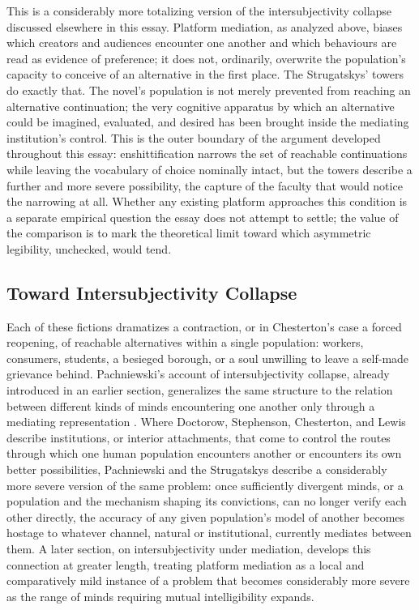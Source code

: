 \documentclass[11pt]{article}
\begin{document}
This is a considerably more totalizing version of the intersubjectivity collapse discussed elsewhere in this essay. Platform mediation, as analyzed above, biases which creators and audiences encounter one another and which behaviours are read as evidence of preference; it does not, ordinarily, overwrite the population's capacity to conceive of an alternative in the first place. The Strugatskys' towers do exactly that. The novel's population is not merely prevented from reaching an alternative continuation; the very cognitive apparatus by which an alternative could be imagined, evaluated, and desired has been brought inside the mediating institution's control. This is the outer boundary of the argument developed throughout this essay: enshittification narrows the set of reachable continuations while leaving the vocabulary of choice nominally intact, but the towers describe a further and more severe possibility, the capture of the faculty that would notice the narrowing at all. Whether any existing platform approaches this condition is a separate empirical question the essay does not attempt to settle; the value of the comparison is to mark the theoretical limit toward which asymmetric legibility, unchecked, would tend.

\subsection{Toward Intersubjectivity Collapse}

Each of these fictions dramatizes a contraction, or in Chesterton's case a forced reopening, of reachable alternatives within a single population: workers, consumers, students, a besieged borough, or a soul unwilling to leave a self-made grievance behind. Pachniewski's account of intersubjectivity collapse, already introduced in an earlier section, generalizes the same structure to the relation between different kinds of minds encountering one another only through a mediating representation \citep{pachniewski2023intersubjectivity}. Where Doctorow, Stephenson, Chesterton, and Lewis describe institutions, or interior attachments, that come to control the routes through which one human population encounters another or encounters its own better possibilities, Pachniewski and the Strugatskys describe a considerably more severe version of the same problem: once sufficiently divergent minds, or a population and the mechanism shaping its convictions, can no longer verify each other directly, the accuracy of any given population's model of another becomes hostage to whatever channel, natural or institutional, currently mediates between them. A later section, on intersubjectivity under mediation, develops this connection at greater length, treating platform mediation as a local and comparatively mild instance of a problem that becomes considerably more severe as the range of minds requiring mutual intelligibility expands.
\end{document}
